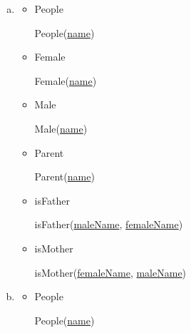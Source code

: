 \documentclass[12pt]{article}
\begin{document}
\begin{enumerate}[1.]
    \begin{enumerate}[a)]
        \item

        \begin{itemize}
            \item People

            \bigskip

            \quad People(\underline{name})

            \bigskip
            \item Female

            \bigskip

            \quad Female(\underline{name})

            \bigskip

            \item Male

            \bigskip

            \quad Male(\underline{name})

            \bigskip

            \item Parent

            \bigskip

            \quad Parent(\underline{name})

            \bigskip

            \item isFather

            \bigskip

            \quad isFather(\underline{maleName}, \underline{femaleName})

            \bigskip

            \item isMother

            \bigskip

            \quad isMother(\underline{femaleName}, \underline{maleName})

            \bigskip
        \end{itemize}

        \item

        \begin{itemize}
            \item People

            \bigskip

            \quad People(\underline{name})


\end{itemize}
\end{enumerate}
\end{enumerate}
\end{document}
